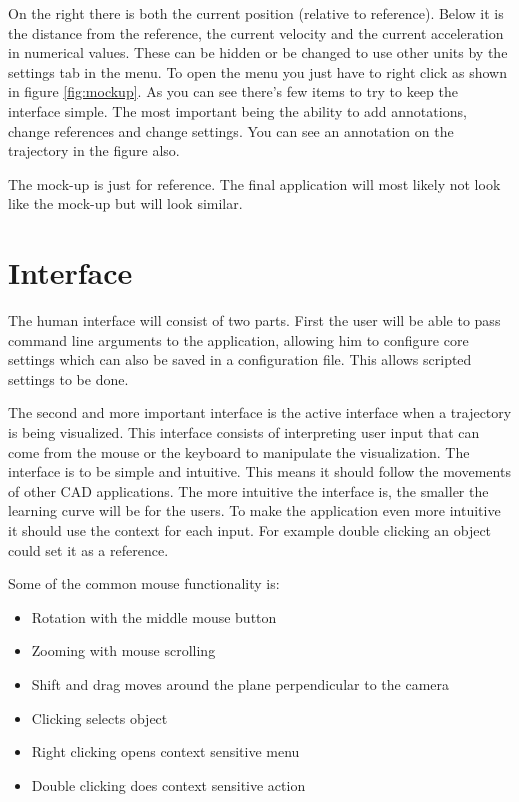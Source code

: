 \documentclass[a4paper,11pt]{article}
\begin{document}
On the right there is both the current position (relative to reference). Below it is the distance from the reference, the current velocity and the current acceleration in numerical values. These can be hidden or be changed to use other units by the settings tab in the menu. To open the menu you just have to right click as shown in figure \ref{fig:mockup}. As you can see there's few items to try to keep the interface simple. The most important being the ability to add annotations, change references and change settings. You can see an annotation on the trajectory in the figure also.

The mock-up is just for reference. The final application will most likely not look like the mock-up but will look similar. 


\section{Interface}

The human interface will consist of two parts. First the user will be able to pass command line arguments to the application, allowing him to configure core settings which can also be saved in a configuration file. This allows scripted settings to be done.

The second and more important interface is the active interface when a trajectory is being visualized. This interface consists of interpreting user input that can come from the mouse or the keyboard to manipulate the visualization. The interface is to be simple and intuitive. This means it should follow the movements of other CAD applications. The more intuitive the interface is, the smaller the learning curve will be for the users. To make the application even more intuitive it should use the context for each input. For example double clicking an object could set it as a reference.

Some of the common mouse functionality is:
\begin{itemize}
\item Rotation with the middle mouse button
\item Zooming with mouse scrolling
\item Shift and drag moves around the plane perpendicular to the camera
\item Clicking selects object
\item Right clicking opens context sensitive menu
\item Double clicking does context sensitive action
\end{itemize}
\end{document}
